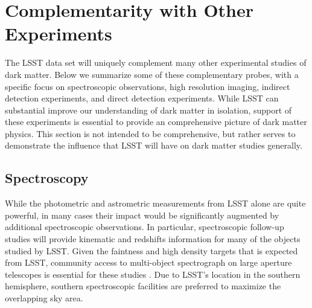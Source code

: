 \section{Complementarity with Other Experiments}
\label{sec:complementarity}

The LSST data set will uniquely complement many other experimental studies of dark matter.
Below we summarize some of these complementary probes, with a specific focus on spectroscopic observations, high resolution imaging, indirect detection experiments, and direct detection experiments.
While LSST can substantial improve our understanding of dark matter in isolation, support of these experiments is essential to provide an comprehensive picture of dark matter physics.
This section is not intended to be comprehensive, but rather serves to demonstrate the influence that LSST will have on dark matter studies generally.

\subsection{Spectroscopy }
\label{sec:spectroscopy}


While the photometric and astrometric measurements from LSST alone are quite powerful, in many cases their impact would be significantly augmented by additional spectroscopic observations. 
In particular, spectroscopic follow-up studies will provide kinematic and redshifts information for many of the objects studied by LSST.
Given the faintness and high density targets that is expected from LSST, community access to multi-object spectrograph on large aperture telescopes is essential for these studies \citep{1610.01661}. 
Due to LSST's location in the southern hemisphere, southern spectroscopic facilities are preferred to maximize the overlapping sky area.

